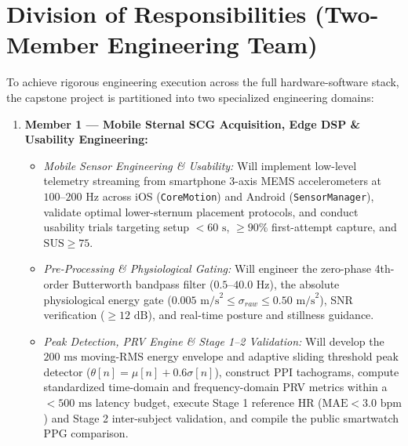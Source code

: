 \section{Division of Responsibilities (Two-Member Engineering Team)}
To achieve rigorous engineering execution across the full hardware-software stack, the capstone project is partitioned into two specialized engineering domains:

\begin{enumerate}
	\item \textbf{Member 1 --- Mobile Sternal SCG Acquisition, Edge DSP \& Usability Engineering:}
	\begin{itemize}
		\item \textit{Mobile Sensor Engineering \& Usability:} Will implement low-level telemetry streaming from smartphone 3-axis MEMS accelerometers at $100\text{--}200\text{ Hz}$ across iOS (\texttt{CoreMotion}) and Android (\texttt{SensorManager}), validate optimal lower-sternum placement protocols, and conduct usability trials targeting setup $< 60\text{ s}$, $\ge 90\%$ first-attempt capture, and $\text{SUS} \ge 75$.
		\item \textit{Pre-Processing \& Physiological Gating:} Will engineer the zero-phase 4th-order Butterworth bandpass filter ($0.5\text{--}40.0\text{ Hz}$), the absolute physiological energy gate ($0.005\text{ m/s}^2 \le \sigma_{raw} \le 0.50\text{ m/s}^2$), SNR verification ($\ge 12\text{ dB}$), and real-time posture and stillness guidance.
		\item \textit{Peak Detection, PRV Engine \& Stage 1--2 Validation:} Will develop the $200\text{ ms}$ moving-RMS energy envelope and adaptive sliding threshold peak detector ($\theta[n] = \mu[n] + 0.6\sigma[n]$), construct PPI tachograms, compute standardized time-domain and frequency-domain PRV metrics within a $< 500\text{ ms}$ latency budget, execute Stage 1 reference HR ($\text{MAE} < 3.0\text{ bpm}$) and Stage 2 inter-subject validation, and compile the public smartwatch PPG comparison.
	\end{itemize}


\end{enumerate}

